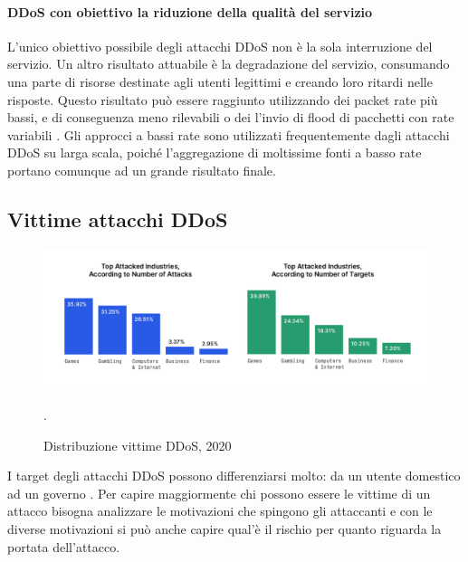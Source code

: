 \paragraph{DDoS con obiettivo la riduzione della qualità del servizio}
\label{paragraph:ddos_degradation}

L'unico obiettivo possibile degli attacchi DDoS non è la sola interruzione del servizio. Un altro risultato attuabile è la degradazione del servizio, consumando una parte di risorse destinate agli utenti legittimi e creando loro ritardi nelle risposte. Questo risultato può essere raggiunto utilizzando dei packet rate più bassi, e di conseguenza meno rilevabili o dei l'invio di flood di pacchetti con rate variabili \cite{ddos_survey_3, ddos_survey_4}.
Gli approcci a bassi rate sono utilizzati frequentemente dagli attacchi DDoS su larga scala, poiché l'aggregazione di moltissime fonti a basso rate portano comunque ad un grande risultato finale.

\subsection{Vittime attacchi DDoS}

\begin{figure}[h]
    \includegraphics[width=\hsize]{images/introduzione/bersagli_ddos.png}
    \caption{Distribuzione vittime DDoS, 2020 \cite{imperva_ddos_report}}.
    \centering
\end{figure}

I target degli attacchi DDoS possono differenziarsi molto: da un utente domestico ad un governo \cite{ddos_motivations}. Per capire maggiormente chi possono essere le vittime di un attacco bisogna analizzare le motivazioni che spingono gli attaccanti e con le diverse motivazioni si può anche capire qual'è il rischio per quanto riguarda la portata dell'attacco. 

